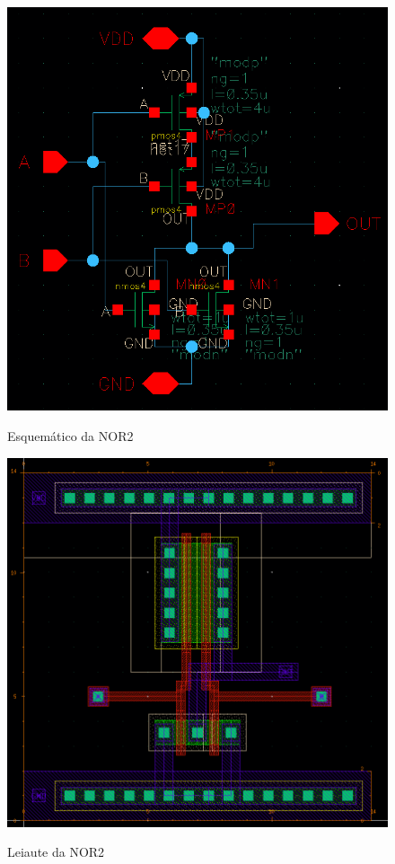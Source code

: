 \documentclass{iiufrgs}
\begin{document}
\begin{figure}[htbp]
    \centering
    \caption{Esquemático da NOR2}
    \includegraphics[scale=0.8]{images/new/schem_nor.png}
    \label{fig:esquematico-nor}
\end{figure}

\begin{figure}[htbp]
    \centering
    \caption{Leiaute da NOR2}
    \includegraphics[scale=0.7]{images/new/layout_nor.png}
    \label{fig:leiaute-nor}
\end{figure}
\end{document}
